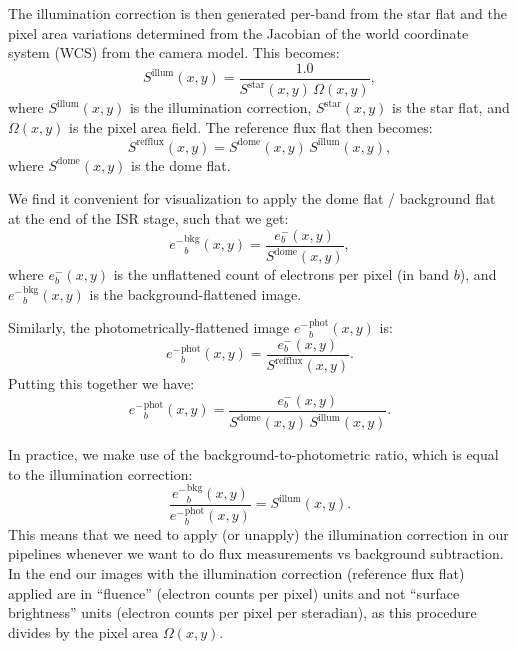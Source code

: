 \documentclass[SE,authoryear,lsstdraft,toc]{lsstdoc}
\newcommand{\etron}{e^{-}}
\begin{document}
The illumination correction is then generated per-band from the star flat and the pixel area variations determined from the Jacobian of the world coordinate system (WCS) from the camera model.
This becomes:
%
\begin{equation}
  S^{\mathrm{illum}}(x, y) = \frac{1.0}{S^{\mathrm{star}}(x, y)\,\Omega(x, y)},
\end{equation}
%
where $S^{\mathrm{illum}}(x, y)$ is the illumination correction, $S^{\mathrm{star}}(x, y)$ is the star flat, and $\Omega(x, y)$ is the pixel area field.
The reference flux flat then becomes:
%
\begin{equation}
  S^{\mathrm{refflux}}(x, y) = S^{\mathrm{dome}}(x, y)\,S^{\mathrm{illum}}(x,
  y),
\end{equation}
%
where $S^{\mathrm{dome}}(x, y)$ is the dome flat.

We find it convenient for visualization to apply the dome flat / background flat at the end of
the ISR stage, such that we get:
%
\begin{equation}
  {\etron}_b^{\mathrm{bkg}}(x, y) = \frac{\etron_b(x, y)}{S^{\mathrm{dome}}(x, y)},
\end{equation}
%
where $\etron_b(x, y)$ is the unflattened count of electrons per pixel (in band $b$), and ${\etron}_b^{\mathrm{bkg}}(x, y)$ is the background-flattened image.

Similarly, the photometrically-flattened image ${\etron}_b^{\mathrm{phot}}(x, y)$ is:
%
\begin{equation}
  {\etron}_b^{\mathrm{phot}}(x, y) = \frac{\etron_b(x,
    y)}{S^{\mathrm{refflux}}(x, y)}.
\end{equation}
%
Putting this together we have:
%
\begin{equation}
  {\etron}_b^{\mathrm{phot}}(x, y) = \frac{\etron_b(x, y)}{S^{\mathrm{dome}}(x,
    y)\, S^{\mathrm{illum}}(x, y)}.
\end{equation}
%

In practice, we make use of the background-to-photometric ratio, which is equal to the illumination correction:
%
\begin{equation}
  \frac{{\etron}_b^{\mathrm{bkg}}(x, y)}{{\etron}_b^{\mathrm{phot}}(x, y)} =
  S^{\mathrm{illum}}(x, y).
\end{equation}
%
This means that we need to apply (or unapply) the illumination correction in our pipelines whenever we want to do flux measurements vs background subtraction.
In the end our images with the illumination correction (reference flux flat) applied are in ``fluence'' (electron counts per pixel) units and not ``surface brightness'' units (electron counts per pixel per steradian), as this procedure divides by the pixel area $\Omega(x, y)$.
\end{document}
